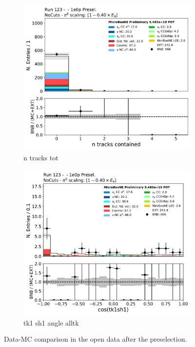 \begin{figure}[H] 
\begin{center}
    \begin{subfigure}[b]{0.3\textwidth}
    \centering
    \includegraphics[width=1.00\textwidth]{1e0p/dataMCRun123/n_tracks_tot.pdf}
    \caption{\label{fig:1e0p:dataMCRun1:shr_start_y} n tracks tot }
    \end{subfigure}
    \begin{subfigure}[b]{0.3\textwidth}
    \centering
    \includegraphics[width=1.00\textwidth]{1e0p/dataMCRun123/tk1sh1_angle_alltk.pdf}
    \caption{\label{fig:1e0p:dataMCRun1:shr_end_y} tk1 sh1 angle alltk }
    \end{subfigure}
\caption{\label{fig:1e0p:dataMCRun1:exitingtrack}Data-MC comparison in the open data after the \zpsel preselection.}
\end{center}
\end{figure}

